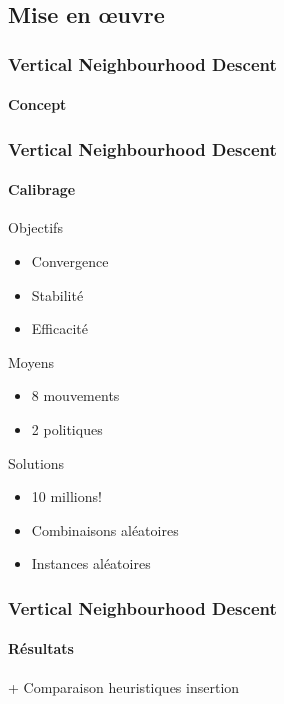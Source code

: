 \subsection{Mise en \oe uvre}
\begin{frame}
	\frametitle{Vertical Neighbourhood Descent}
	\framesubtitle{Concept}
\end{frame}
\begin{frame}
	\frametitle{Vertical Neighbourhood Descent}
	\framesubtitle{Calibrage}
	\begin{alertblock}{Objectifs}
		\begin{itemize}
			\item Convergence
			\item Stabilité
			\item Efficacité
		\end{itemize}
	\end{alertblock}
	\begin{block}{Moyens}
		\begin{itemize}
			\item 8 mouvements
			\item 2 politiques
		\end{itemize}
	\end{block}
	\begin{exampleblock}{Solutions}
		\begin{itemize}
			\item 10 millions!
			\item Combinaisons aléatoires
			\item Instances aléatoires
		\end{itemize}
	\end{exampleblock}
\end{frame}
\begin{frame}
	\frametitle{Vertical Neighbourhood Descent}
	\framesubtitle{Résultats}
	+ Comparaison heuristiques insertion
\end{frame}
